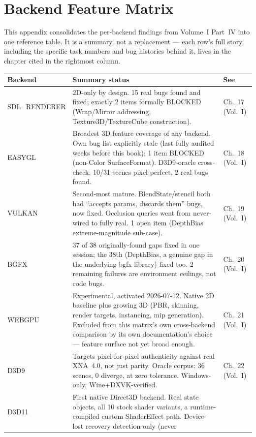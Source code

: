\chapter{Backend Feature Matrix}
\label{ch:feature-matrix}

This appendix consolidates the per-backend findings from Volume~I Part~IV into one reference
table. It is a summary, not a replacement --- each row's full story, including the specific
task numbers and bug histories behind it, lives in the chapter cited in the rightmost column.

\begin{center}
\small
\begin{tabular}{lp{7.6cm}l}
\toprule
\textbf{Backend} & \textbf{Summary status} & \textbf{See} \\
\midrule
SDL\_RENDERER & 2D-only by design. 15 real bugs found and fixed; exactly 2 items formally
  BLOCKED (Wrap/Mirror addressing, Texture3D/TextureCube construction). & Ch.~17 (Vol.~I) \\
EASYGL & Broadest 3D feature coverage of any backend. Own bug list explicitly stale (last
  fully audited weeks before this book); 1 item BLOCKED (non-Color SurfaceFormat). D3D9-oracle
  cross-check: 10/31 scenes pixel-perfect, 2 real bugs found. & Ch.~18 (Vol.~I) \\
VULKAN & Second-most mature. BlendState/stencil both had ``accepts params, discards them''
  bugs, now fixed. Occlusion queries went from never-wired to fully real. 1 open item
  (DepthBias extreme-magnitude sub-case). & Ch.~19 (Vol.~I) \\
BGFX & 37 of 38 originally-found gaps fixed in one session; the 38th (DepthBias, a genuine
  gap in the underlying bgfx library) fixed too. 2 remaining failures are environment
  ceilings, not code bugs. & Ch.~20 (Vol.~I) \\
WEBGPU & Experimental, activated 2026-07-12. Native 2D baseline plus growing 3D (PBR, skinning,
  render targets, instancing, mip generation). Excluded from this matrix's own cross-backend
  comparison by its own documentation's choice --- feature surface not yet broad enough. & Ch.~21 (Vol.~I) \\
D3D9 & Targets pixel-for-pixel authenticity against real XNA~4.0, not just parity. Oracle
  corpus: 36 scenes, 0 diverge, at zero tolerance. Windows-only, Wine+DXVK-verified. & Ch.~22 (Vol.~I) \\
D3D11 & First native Direct3D backend. Real state objects, all 10 stock shader variants, a
  runtime-compiled custom ShaderEffect path. Device-lost recovery detection-only (never

\end{tabular}
\end{center}
